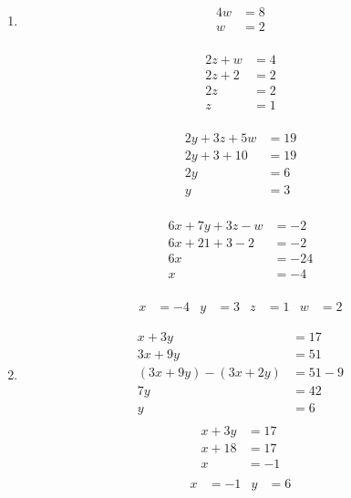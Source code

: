 \documentclass[10pt,oneside,a4paper]{article}
\begin{document}
\begin{enumerate}
\item 

\[
\begin{split}
4w &= 8 \\
w &= 2 \\
\end{split}
\]

\[
\begin{split}
2z + w &= 4 \\
2z + 2 &= 2 \\
2z &= 2 \\
z &= 1 \\
\end{split}
\]

\[
\begin{split}
2y + 3z + 5w &= 19 \\
2y + 3 + 10 &= 19 \\
2y &= 6 \\
y &= 3 \\
\end{split}
\]

\[
\begin{split}
6x + 7y + 3z - w &= -2 \\
6x + 21 + 3 - 2 &= -2 \\
6x &= -24 \\
x &= -4 \\
\end{split}
\]

\begin{align*}
x &= -4 & y &= 3 & z &= 1 & w &= 2
\end{align*}

\item 

\[
\begin{split}
x + 3y &= 17 \\
3x + 9y &= 51 \\
(3x + 9y) - (3x + 2y) &= 51 - 9 \\
7y &= 42 \\
y &= 6 \\
\end{split}
\]
\[
\begin{split}
x + 3y &= 17 \\
x + 18 &= 17 \\
x &= -1 \\
\end{split}
\]
\begin{align*}
x &= -1 & y &= 6
\end{align*}


\end{enumerate}
\end{document}
